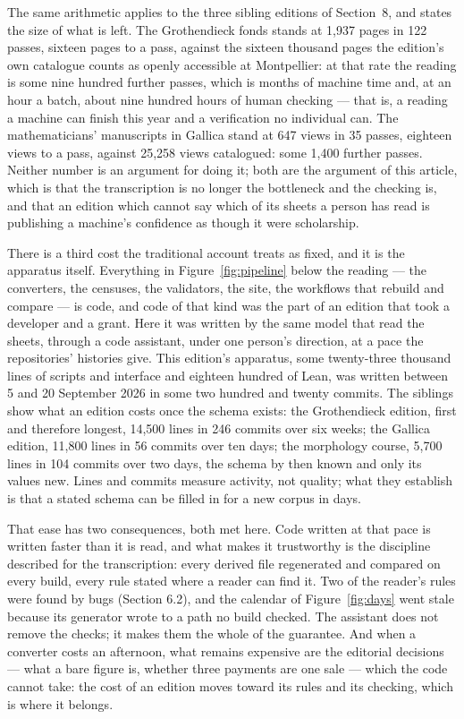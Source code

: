The same arithmetic applies to the three sibling editions of Section~8, and
states the size of what is left. The Grothendieck fonds stands at 1,937 pages
in 122 passes, sixteen pages to a pass, against the sixteen thousand pages the
edition's own catalogue counts as openly accessible at Montpellier: at that
rate the reading is some nine hundred further passes, which is months of
machine time and, at an hour a batch, about nine hundred hours of human
checking --- that is, a reading a machine can finish this year and a
verification no individual can. The mathematicians' manuscripts in Gallica
stand at 647 views in 35 passes, eighteen views to a pass, against 25,258
views catalogued: some 1,400 further passes. Neither number is an argument for doing it; both are the
argument of this article, which is that the transcription is no longer the
bottleneck and the checking is, and that an edition which cannot say which of
its sheets a person has read is publishing a machine's confidence as though it
were scholarship.

There is a third cost the traditional account treats as fixed, and it is the
apparatus itself. Everything in Figure~\ref{fig:pipeline} below the reading
--- the converters, the censuses, the validators, the site, the workflows
that rebuild and compare --- is code, and code of that kind was the part of
an edition that took a developer and a grant. Here it was written by the same
model that read the sheets, through a code assistant, under one person's
direction, at a pace the repositories' histories give. This edition's
apparatus, some twenty-three thousand lines of scripts and interface and
eighteen hundred of Lean, was written between 5 and 20 September 2026 in some two
hundred and twenty commits. The siblings show what an edition costs once the schema exists: the
Grothendieck edition, first and therefore longest, 14,500 lines in 246
commits over six weeks; the Gallica edition, 11,800 lines in 56 commits over
ten days; the morphology course, 5,700 lines in 104 commits over two days,
the schema by then known and only its values new. Lines and commits measure
activity, not quality; what they establish is that a stated schema can be
filled in for a new corpus in days.

That ease has two consequences, both met here. Code written at that pace is
written faster than it is read, and what makes it trustworthy is the
discipline described for the transcription: every derived file regenerated
and compared on every build, every rule stated where a reader can find it.
Two of the reader's rules were found by bugs (Section 6.2), and the calendar
of Figure~\ref{fig:days} went stale because its generator wrote to a path no
build checked. The assistant does not remove the checks; it makes them the
whole of the guarantee. And when a converter costs an afternoon, what remains
expensive are the editorial decisions --- what a bare figure is, whether
three payments are one sale --- which the code cannot take: the cost of an
edition moves toward its rules and its checking, which is where it belongs.
